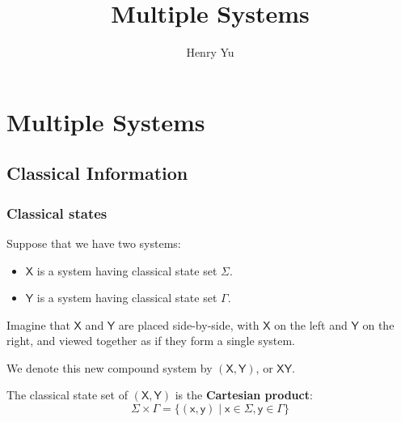\documentclass{report}
\title{\Huge{Multiple Systems}}
\author{\huge{Henry Yu}}
\date{}
\begin{document}
\raggedright

\maketitle
\newpage
{}
\tableofcontents
\pagebreak


\chapter{Multiple Systems}
\section{Classical Information}
\subsection{Classical states}
Suppose that we have two systems:
\begin{itemize}
    \item $\mathsf{X}$ is a system having classical state set $\Sigma$.
    \item $\mathsf{Y}$ is a system having classical state set $\Gamma$.
\end{itemize}
Imagine that $\mathsf{X}$ and $\mathsf{Y}$ are placed side-by-side, with $\mathsf{X}$ on the left and $\mathsf{Y}$ on the right, and viewed together as if they form a single system.

\bigbreak

We denote this new compound system by $(\mathsf{X},\mathsf{Y})$, or $\mathsf{XY}$.

\begin{sol}
    The classical state set of $(\mathsf{X},\mathsf{Y})$ is the \textbf{Cartesian product}:
    \begin{equation*}
        \Sigma \times \Gamma = \{(\mathsf{x},\mathsf{y}) \mid \mathsf{x} \in \Sigma, \mathsf{y} \in \Gamma\}
    \end{equation*}
\end{sol}

\end{document}
